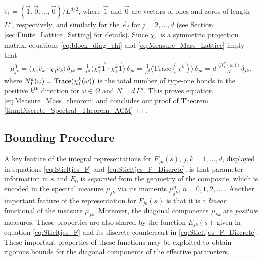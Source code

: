 \documentclass{cmslatex}
\begin{document}
$\hat{e}_1=(\vec{1},\vec{0},\ldots,\vec{0})/L^{d/2}$, where $\vec{1}$ and
$\vec{0}$ are vectors of ones and zeros of length $L^d$, respectively,
and similarly for the $\vec{e}_j$ for $j=2,\ldots,d$ (see Section
\ref{sec:Finite_Lattice_Setting} for details). Since $\chi_1$ is a symmetric
projection matrix, equations \eqref{eq:block_diag_chi} and
\eqref{eq:Measure_Mass_Lattice} imply that
%
\begin{align}\label{eq:Measure_Mass_Lattice_Trace}
  \mu^0_{jk}%
       =\langle\chi_1\hat{e}_k\cdot\chi_1\hat{e}_k\rangle\,\delta_{jk}
       =\frac{1}{L^d}\langle\chi_1^k\vec{1}\cdot \chi_1^k\vec{1}\rangle\,\delta_{jk}
       =\frac{1}{L^d}\langle\text{Trace}(\chi_1^k)\rangle\,\delta_{jk}
       =d\,\frac{\langle N_1^k(\omega)\rangle}{N}\,\delta_{jk},       
\end{align}
%
where $N_1^k(\omega)={\rm Trace}(\chi_1^k(\omega))$ is the total number of type-one
bonds in the positive $k^{\text{th}}$ direction for $\omega\in\Omega$ and
$N=d\,L^d$. This proves equation \eqref{eq:Measure_Mass_theorem} and
concludes our proof of Theorem \ref{thm:Discrete_Spectral_Theorem_ACM}
$\Box\,$.       


\subsection{Bounding Procedure}\label{sec:Bounding_Procedure}
%
A key feature of the integral representations for $F_{jk}(s)$,
$j,k=1,\ldots,d$, displayed in equations \eqref{eq:Stieltjes_F} and
\eqref{eq:Stieltjes_F_Discrete}, is that parameter information in $s$
and $E_0$ is \emph{separated} from the geometry of the composite,
which is encoded in the spectral measure $\mu_{jk}$ via its moments  
$\mu^n_{jk}$, $n=0,1,2,\ldots$ \cite{Bruno:JSP-365,Golden:CMP-473}. Another
important feature of the representation for $F_{jk}(s)$ is that it
is a \emph{linear} functional of the measure $\mu_{jk}$. Moreover, the
diagonal components $\mu_{kk}$ are \emph{positive} measures. These
properties are also shared by the function $E_{jk}(s)$ given in
equation \eqref{eq:Stieltjes_F} and its discrete counterpart in
\eqref{eq:Stieltjes_F_Discrete}. These important properties of these
functions may be exploited to obtain rigorous bounds for the diagonal
components of the effective parameters.  
\end{document}

